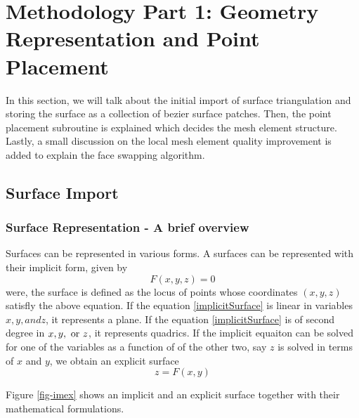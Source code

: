 \chapter{Methodology Part 1: Geometry Representation and Point Placement}

In this section, we will talk about the initial import of surface triangulation and storing the surface as a collection of bezier surface patches. Then, the point placement subroutine is explained which decides the mesh element structure. Lastly, a small discussion on the local mesh element quality improvement is added to explain the face swapping algorithm. 

\section{Surface Import}

\subsection{Surface Representation - A brief overview}

Surfaces can be represented in various forms. A surfaces can be represented with their implicit form, given by
\begin{equation}
F(x, y, z) = 0
\label{implicitSurface}
\end{equation}
were, the surface is defined as the locus of points whose coordinates $(x, y, z)$ satisfly the above equation. If the equation \ref{implicitSurface} is linear in variables $x, y, and z$, it represents a plane. If the equation \ref{implicitSurface} is of second degree in $x, y, \textnormal{ or } z$, it represents quadrics. If the implicit equaiton can be solved for one of the variables as a function of of the other two, say $z$ is solved in terms of $x$ and $y$, we obtain an explicit surface
\begin{equation}
z = F(x,y)
\end{equation}

Figure \ref{fig-imex} shows an implicit and an explicit surface together with their mathematical formulations.


